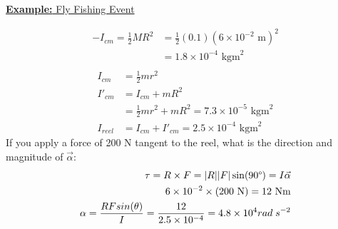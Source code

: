 \documentclass[a4paper]{article}
\let\bf\textbf
\begin{document}
\begin{shaded}
    \underline{\bf{Example:} Fly Fishing Event}
    \vspace{2mm}\\
    \begin{align*}
        -I_{cm} = \frac{1}{2}MR^2 &= \frac{1}{2}(0.1)(6\times 10^{-2}\text{ m})^2\\
        &= 1.8\times 10^{-4}\text{ kgm}^2\\
    \end{align*}
    \begin{align*}
        I_{cm} &= \frac{1}{2}mr^2\\
        I'_{cm} &= I_{cm} + mR^2\\
        &= \frac{1}{2}mr^2 + mR^2 = 7.3 \times 10^{-5}\text{ kgm}^2 \\
        I_{reel} &= I_{cm} + I'_{cm} = 2.5\times 10^{-4}\text{ kgm}^2
    \end{align*}
    If you apply a force of 200 N tangent to the reel, what is the direction and magnitude of $\vec{\alpha}$:
    \begin{align*}
        \tau = R \times F = |R||F|\sin(90\degree) = I\vec{\alpha}\\
        6\times 10^{-2} \times (200\text{ N}) = 12\text{ Nm}\\
        \alpha = \frac{RFsin(\theta)}{I} = \frac{12}{2.5 \times 10^{-4}} = 4.8 \times 10^{4} rad\;s^{-2}
    \end{align*}
\end{shaded}
\end{document}
